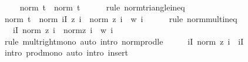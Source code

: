 \begin{isabellebody}
\ \isamarkupfalse%
\ {\isachardoublequoteopen}{\isasymdots}\ {\isasymle}\ norm\ {\isacharquery}{\kern0pt}t{}\ {\isacharplus}{\kern0pt}\ norm\ {\isacharquery}{\kern0pt}t{}{\isachardoublequoteclose}\isanewline
\ \ \ \ \isamarkupfalse%
\ {\isacharparenleft}{\kern0pt}rule\ norm{\isacharunderscore}{\kern0pt}triangle{\isacharunderscore}{\kern0pt}ineq{\isacharparenright}{\kern0pt}\isanewline
\ \ \isamarkupfalse%
\ \isamarkupfalse%
\ {\isachardoublequoteopen}norm\ {\isacharquery}{\kern0pt}t{}\ {\isasymle}\ norm\ {\isacharparenleft}{\kern0pt}{\isasymProd}i{\isasymin}I{\isachardot}{\kern0pt}\ z\ i{\isacharparenright}{\kern0pt}\ {\isacharasterisk}{\kern0pt}\ norm\ {\isacharparenleft}{\kern0pt}z\ i\ {\isacharminus}{\kern0pt}\ w\ i{\isacharparenright}{\kern0pt}{\isachardoublequoteclose}\isanewline
\ \ \ \ \isamarkupfalse%
\ {\isacharparenleft}{\kern0pt}rule\ norm{\isacharunderscore}{\kern0pt}mult{\isacharunderscore}{\kern0pt}ineq{\isacharparenright}{\kern0pt}\isanewline
\ \ \isamarkupfalse%
\ \isamarkupfalse%
\ {\isachardoublequoteopen}{\isasymdots}\ {\isasymle}\ {\isacharparenleft}{\kern0pt}{\isasymProd}i{\isasymin}I{\isachardot}{\kern0pt}\ norm\ {\isacharparenleft}{\kern0pt}z\ i{\isacharparenright}{\kern0pt}{\isacharparenright}{\kern0pt}\ {\isacharasterisk}{\kern0pt}\ norm{\isacharparenleft}{\kern0pt}z\ i\ {\isacharminus}{\kern0pt}\ w\ i{\isacharparenright}{\kern0pt}{\isachardoublequoteclose}\isanewline
\ \ \ \ \isamarkupfalse%
\ {\isacharparenleft}{\kern0pt}rule\ mult{\isacharunderscore}{\kern0pt}right{\isacharunderscore}{\kern0pt}mono{\isacharparenright}{\kern0pt}\ {\isacharparenleft}{\kern0pt}auto\ intro{\isacharcolon}{\kern0pt}\ norm{\isacharunderscore}{\kern0pt}prod{\isacharunderscore}{\kern0pt}le{\isacharparenright}{\kern0pt}\isanewline
\ \ \isamarkupfalse%
\ \isamarkupfalse%
\ {\isachardoublequoteopen}{\isacharparenleft}{\kern0pt}{\isasymProd}i{\isasymin}I{\isachardot}{\kern0pt}\ norm\ {\isacharparenleft}{\kern0pt}z\ i{\isacharparenright}{\kern0pt}{\isacharparenright}{\kern0pt}\ {\isasymle}\ {\isacharparenleft}{\kern0pt}{\isasymProd}i{\isasymin}I{\isachardot}{\kern0pt}\ {}{\isacharparenright}{\kern0pt}{\isachardoublequoteclose}\isanewline
\ \ \ \ \isamarkupfalse%
\ {\isacharparenleft}{\kern0pt}intro\ prod{\isacharunderscore}{\kern0pt}mono{\isacharparenright}{\kern0pt}\ {\isacharparenleft}{\kern0pt}auto\ intro{\isacharbang}{\kern0pt}{\isacharcolon}{\kern0pt}\ insert{\isacharparenright}{\kern0pt}\isanewline

\end{isabellebody}

